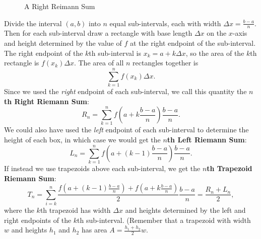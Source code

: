 \begin{figure}[h!]
{

}
\caption{A Right Reimann Sum}
\end{figure}

Divide the interval $(a,b)$ into $n$ equal sub-intervals, each with width $\Delta x= \frac{b-a}{n}$. Then for each sub-interval draw a rectangle with base length $\Delta x$ on the $x$-axis and height determined by the value of $f$ at the right endpoint of the sub-interval. The right endpoint of the $k$th sub-interval is $x_k=a+k\Delta x$, so the area of the $k$th rectangle is $f(x_k) \Delta x$. The area of all $n$ rectangles together is
$$\sum_{k=1}^{n}f(x_k)\Delta x.$$
Since we used the \textit{right} endpoint of each sub-interval, we call this quantity the \textbf{$n$th Right Riemann Sum}:
$$R_n=\sum_{k=1}^{n}f\left(a+k\frac{b-a}{n}\right)\frac{b-a}{n}.$$
We could also have used the \textit{left} endpoint of each sub-interval to determine the height of each box, in which case we would get the \textbf{$n$th Left Riemann Sum}:
$$L_n=\sum_{k=1}^{n}f\left(a+(k-1)\frac{b-a}{n}\right)\frac{b-a}{n}.$$
If instead we use trapezoids above each sub-interval, we get the \textbf{$n$th Trapezoid Riemann Sum}: 
$$T_n=\sum_{i=k}^{n}\frac{f\left(a+(k-1)\frac{b-a}{n}\right)+f\left(a+k\frac{b-a}{n}\right)}{2}\frac{b-a}{n}=\frac{R_n+L_n}{2},$$
where the $k$th trapezoid has width $\Delta x$ and heights determined by the left and right endpoints of the $k$th sub-interval. (Remember that a trapezoid with width $w$ and heights $h_1$ and $h_2$ has area $A=\frac{h_1+h_2}{2}w$. 

